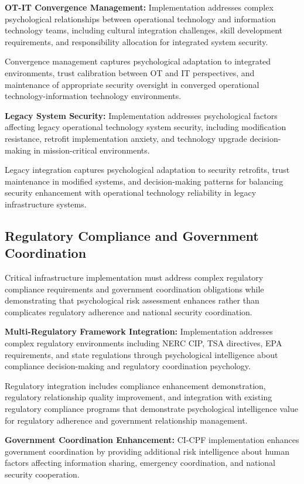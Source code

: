 \documentclass[10pt, twocolumn]{article}
\begin{document}
\textbf{OT-IT Convergence Management:} Implementation addresses complex psychological relationships between operational technology and information technology teams, including cultural integration challenges, skill development requirements, and responsibility allocation for integrated system security.

Convergence management captures psychological adaptation to integrated environments, trust calibration between OT and IT perspectives, and maintenance of appropriate security oversight in converged operational technology-information technology environments.

\textbf{Legacy System Security:} Implementation addresses psychological factors affecting legacy operational technology system security, including modification resistance, retrofit implementation anxiety, and technology upgrade decision-making in mission-critical environments.

Legacy integration captures psychological adaptation to security retrofits, trust maintenance in modified systems, and decision-making patterns for balancing security enhancement with operational technology reliability in legacy infrastructure systems.

\subsection{Regulatory Compliance and Government Coordination}

Critical infrastructure implementation must address complex regulatory compliance requirements and government coordination obligations while demonstrating that psychological risk assessment enhances rather than complicates regulatory adherence and national security coordination.

\textbf{Multi-Regulatory Framework Integration:} Implementation addresses complex regulatory environments including NERC CIP, TSA directives, EPA requirements, and state regulations through psychological intelligence about compliance decision-making and regulatory coordination psychology.

Regulatory integration includes compliance enhancement demonstration, regulatory relationship quality improvement, and integration with existing regulatory compliance programs that demonstrate psychological intelligence value for regulatory adherence and government relationship management.

\textbf{Government Coordination Enhancement:} CI-CPF implementation enhances government coordination by providing additional risk intelligence about human factors affecting information sharing, emergency coordination, and national security cooperation.
\end{document}
